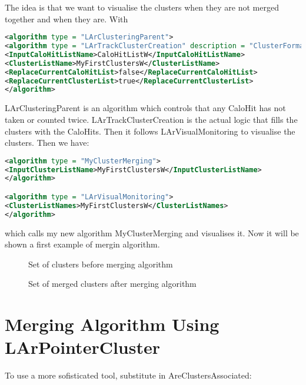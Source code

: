 The idea is that we want to visualise the clusters when they are not merged together and when they are. With

\begin{lstlisting}[language=XML]
<algorithm type = "LArClusteringParent">
<algorithm type = "LArTrackClusterCreation" description = "ClusterFormation"/>
<InputCaloHitListName>CaloHitListW</InputCaloHitListName>
<ClusterListName>MyFirstClustersW</ClusterListName>
<ReplaceCurrentCaloHitList>false</ReplaceCurrentCaloHitList>
<ReplaceCurrentClusterList>true</ReplaceCurrentClusterList>
</algorithm>
\end{lstlisting}

LArClusteringParent is an algorithm which controls that any CaloHit has not taken or counted twice. LArTrackClusterCreation is the actual logic that fills the clusters with the CaloHits. Then it follows LArVisualMonitoring to visualise the clusters. Then we have:  

\begin{lstlisting}[language=XML]
<algorithm type = "MyClusterMerging">
<InputClusterListName>MyFirstClustersW</InputClusterListName>
</algorithm>

<algorithm type = "LArVisualMonitoring"> 
<ClusterListNames>MyFirstClustersW</ClusterListNames> 
</algorithm> 
\end{lstlisting}
which calls my new algorithm MyClusterMerging and visualises it. Now it will be shown a first example of mergin algorithm.
\begin{figure}[h]
\centering
\caption{Set of clusters before merging algorithm}
\label{fig:cluster1}
\end{figure}

\begin{figure}[h]
\centering
\caption{Set of merged clusters after merging algorithm}
\label{fig:cluster2}
\end{figure}

\section{Merging Algorithm Using LArPointerCluster} \label{sssec:larpointer_cluster}
To use a more sofisticated tool, substitute in AreClustersAssociated: 

